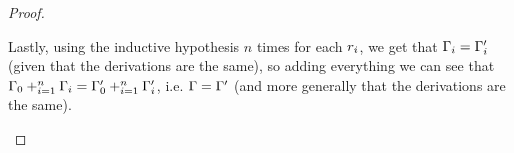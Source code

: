 \begin{proof}
\begin{enumerate}
  Lastly, using the inductive hypothesis $n$ times for each $r_i$,
    we get that $\Gamma_i = \Gamma'_i$ (given that the derivations are the same),
  so adding everything we can see that
    $\Gamma_0 +_{i=1}^{n} \Gamma_i = \Gamma'_0 +_{i=1}^{n} \Gamma'_i$, i.e. $\Gamma = \Gamma'$
    (and more generally that the derivations are the same).
\end{enumerate}
\end{proof}


